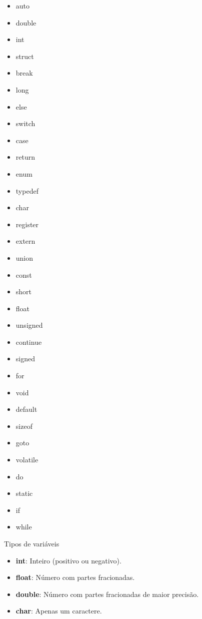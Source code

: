 \documentclass[12pt]{article}
\begin{document}
\begin{itemize}
	\item auto     
	\item double          
	\item int                                
	\item struct
	\item break                                    
	\item long                                 
	\item else                          
	\item switch
	\item case                                 
	\item return         
	\item enum                               
	\item typedef
	\item char                                 
	\item register                             
	\item extern                             
	\item union
	\item const                                
	\item short                                
	\item float                              
	\item unsigned
	\item continue                             
	\item signed                                
	\item for                                
	\item void
	\item default                              
	\item sizeof                                
	\item goto                               
	\item volatile
	\item do                                  
	\item static                                
	\item if                                 
	\item while
\end{itemize}
Tipos de variáveis\label{tipovariavel}
\begin{itemize}
	\item \textbf{int}: Inteiro (positivo ou negativo).
	\item \textbf{float}: Número com partes fracionadas.
	\item \textbf{double}: Número com partes fracionadas de maior precisão.
	\item \textbf{char}: Apenas um caractere.
\end{itemize}
\end{document}
